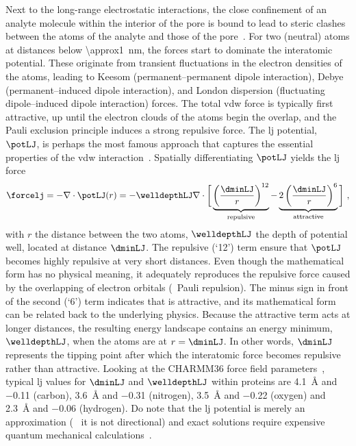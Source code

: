 Next to the long-range electrostatic interactions, the close confinement of an analyte molecule within the
interior of the pore is bound to lead to steric clashes between the atoms of the analyte and those of the
pore~\cite{Buchsbaum-2013}. For two (neutral) atoms at distances below \SI{\approx1}{\nm}, the 
forces start to dominate the interatomic potential. These originate from transient fluctuations in the
electron densities of the atoms, leading to Keesom (permanent--permanent dipole interaction), Debye
(permanent--induced dipole interaction), and London dispersion (fluctuating dipole--induced dipole
interaction) forces. The total \gls{vdw} force is typically first attractive, up until the electron clouds of
the atoms begin the overlap, and the Pauli exclusion principle induces a strong repulsive force. The \gls{lj}
potential, $\potLJ$, is perhaps the most famous approach that captures the essential properties of the
\gls{vdw} interaction~\cite{Paquet-2015}. Spatially differentiating $\potLJ$ yields the \gls{lj} force 
%
\begin{equation}\label{eq:nanopores_LJ_force}
  \forcelj = - \nabla \cdot \potLJ( r ) = - \welldepthLJ \nabla \cdot \bigg[ 
    \underbrace{ \left( \dfrac{ \dminLJ }{ r } \right)^{12} }_{\text{repulsive}}
    -
    \underbrace{ 2 \left( \dfrac{ \dminLJ }{ r } \right)^{6} }_{\text{attractive}}
  \bigg]
  \text{ ,}
\end{equation}
% 
with $r$ the distance between the two atoms, $\welldepthLJ$ the depth of potential well, located at distance
$\dminLJ$. The repulsive (`12') term ensure that $\potLJ$ becomes highly repulsive at very short distances.
Even though the mathematical form has no physical meaning, it adequately reproduces the repulsive force caused
by the overlapping of electron orbitals (\ie~Pauli repulsion). The minus sign in front of the second (`6')
term indicates that is attractive, and its mathematical form can be related back to the underlying physics.
Because the attractive term acts at longer distances, the resulting energy landscape contains an energy
minimum, $\welldepthLJ$, when the atoms are at $r = \dminLJ$. In other words, $\dminLJ$ represents the tipping
point after which the interatomic force becomes repulsive rather than attractive. Looking at the {CHARMM36}
force field parameters~\cite{Huang-2016}, typical \gls{lj} values for $\dminLJ$ and $\welldepthLJ$ within
proteins are \SI{4.1}{\angstrom} and \SI{-0.11}{\kbt} (carbon), \SI{3.6}{\angstrom} and \SI{-0.31}{\kbt}
(nitrogen), \SI{3.5}{\angstrom} and \SI{-0.22}{\kbt} (oxygen) and \SI{2.3}{\angstrom} and \SI{-0.06}{\kbt}
(hydrogen). Do note that the \gls{lj} potential is merely an approximation (\eg~ it is not directional) and
exact solutions require expensive quantum mechanical calculations~\cite{Paquet-2015}.


